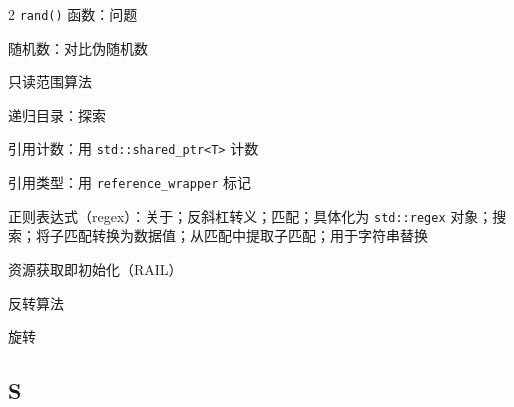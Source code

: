 \begin{multicols}{2}
\noindent \texttt{rand(\allowbreak{})\allowbreak{}} 函数：问题\par
\noindent 随机数：对比伪随机数\par
\noindent 只读范围算法\par
\noindent 递归目录：探索\par
\noindent 引用计数：用 \texttt{std::\allowbreak{}shared\_\allowbreak{}ptr<\allowbreak{}T>\allowbreak{}} 计数\par
\noindent 引用类型：用 \texttt{reference\_\allowbreak{}wrapper} 标记\par
\noindent 正则表达式（regex）：关于；反斜杠转义；匹配；具体化为 \texttt{std::\allowbreak{}regex} 对象；搜索；将子匹配转换为数据值；从匹配中提取子匹配；用于字符串替换\par
\noindent 资源获取即初始化（RAIL）\par
\noindent 反转算法\par
\noindent 旋转\par

\subsection*{S}


\end{multicols}
